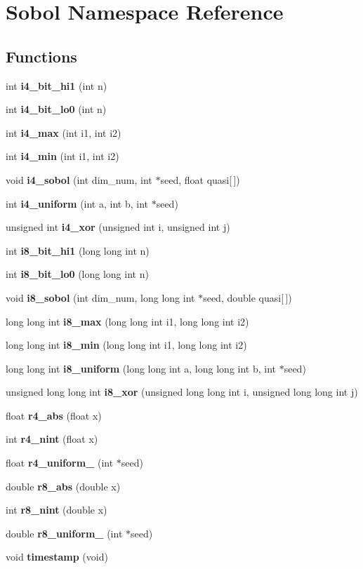 \section{Sobol Namespace Reference}
\label{namespaceSobol}


\subsection*{Functions}
\begin{CompactItemize}
\item 
int {\bf i4\_\-bit\_\-hi1} (int n)
\item 
int {\bf i4\_\-bit\_\-lo0} (int n)
\item 
int {\bf i4\_\-max} (int i1, int i2)
\item 
int {\bf i4\_\-min} (int i1, int i2)
\item 
void {\bf i4\_\-sobol} (int dim\_\-num, int $\ast$seed, float quasi[$\,$])
\item 
int {\bf i4\_\-uniform} (int a, int b, int $\ast$seed)
\item 
unsigned int {\bf i4\_\-xor} (unsigned int i, unsigned int j)
\item 
int {\bf i8\_\-bit\_\-hi1} (long long int n)
\item 
int {\bf i8\_\-bit\_\-lo0} (long long int n)
\item 
void {\bf i8\_\-sobol} (int dim\_\-num, long long int $\ast$seed, double quasi[$\,$])
\item 
long long int {\bf i8\_\-max} (long long int i1, long long int i2)
\item 
long long int {\bf i8\_\-min} (long long int i1, long long int i2)
\item 
long long int {\bf i8\_\-uniform} (long long int a, long long int b, int $\ast$seed)
\item 
unsigned long long int {\bf i8\_\-xor} (unsigned long long int i, unsigned long long int j)
\item 
float {\bf r4\_\-abs} (float x)
\item 
int {\bf r4\_\-nint} (float x)
\item 
float {\bf r4\_\-uniform\_} (int $\ast$seed)
\item 
double {\bf r8\_\-abs} (double x)
\item 
int {\bf r8\_\-nint} (double x)
\item 
double {\bf r8\_\-uniform\_} (int $\ast$seed)
\item 
void {\bf timestamp} (void)
\end{CompactItemize}


